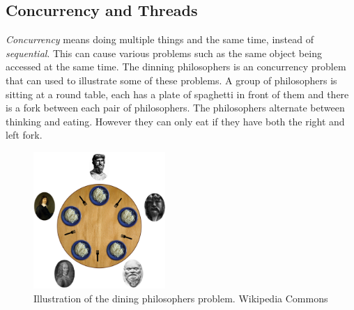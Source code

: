 \documentclass[10pt,a4paper]{report}
\begin{document}
\subsection{Concurrency and Threads}
\label{concurrency}
\emph{Concurrency} means doing multiple things and the same time, instead of \emph{sequential}. This can cause various problems such as the same object being accessed at the same time. The dinning philosophers is an concurrency problem that can used to illustrate some of these problems. A group of philosophers is sitting at a round table, each has a plate of spaghetti in front of them and there is a fork between each pair of philosophers\cite{hoare1985communicating}. The philosophers alternate between thinking and eating. However they can only eat if they have both the right and left fork\cite{hoare1985communicating}.

\begin{figure}[h]
    \centering
    \includegraphics[width=5cm]{dining_philosophers.png}
    \caption{Illustration of the dining philosophers problem. Wikipedia Commons}
    \label{fig:dining_philosophers}
\end{figure}
\end{document}
